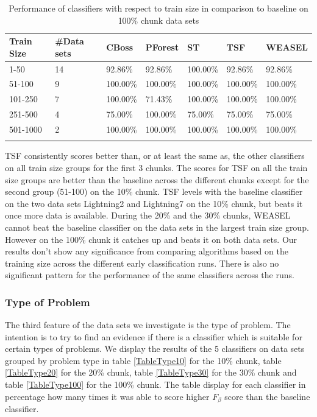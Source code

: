 \begin{table}[hp!]
	\setlength\extrarowheight{2pt} %
	\begin{tabularx}{\textwidth}{|X|X|X|X|X|X|X|}
	\hline
	\textbf{Train Size} & \textbf{\#Data sets} & \textbf{CBoss} & \textbf{PForest} & \textbf{ST} & \textbf{TSF} & \textbf{WEASEL} \\ \hline
		1-50 & 14 & 92.86\% & 92.86\% & 100.00\% & 92.86\% & 92.86\% \\ \hline
		51-100 & 9 & 100.00\% & 100.00\% & 100.00\% & 100.00\% & 100.00\% \\ \hline
		101-250 & 7 & 100.00\% & 71.43\% & 100.00\% & 100.00\% & 100.00\% \\ \hline
		251-500 & 4 & 75.00\% & 100.00\% & 75.00\% & 75.00\% & 75.00\% \\ \hline
		501-1000 & 2 &100.00\% & 100.00\% & 100.00\% & 100.00\% & 100.00\% \\ \hline
  \caption{Performance of classifiers with respect to train size in comparison to baseline on 100\% chunk data sets}
  \label{TableSize100}
  \end{tabularx}
\end{table}

TSF consistently scores better than, or at least the same as, the other classifiers on all train size groups for the first 3 chunks.
The scores for TSF on all the train size groups are better than the baseline across the different chunks except for the second group (51-100) on the 10\% chunk.
TSF levels with the baseline classifier on the two data sets Lightning2 and Lightning7 on the 10\% chunk, but beats it once more data is available.
During the 20\% and the 30\% chunks, WEASEL cannot beat the baseline classifier on the data sets in the largest train size group.
However on the 100\% chunk it catches up and beats it on both data sets.
Our results don't show any significance from comparing algorithms based on the training size across the different early classification runs.
There is also no significant pattern for the performance of the same classifiers across the runs.


\subsubsection{Type of Problem}
The third feature of the data sets we investigate is the type of problem.
The intention is to try to find an evidence if there is a classifier which is suitable for certain types of problems.
We display the results of the 5 classifiers on data sets grouped by problem type in table \ref{TableType10} for the 10\% chunk, table \ref{TableType20} for the 20\% chunk, table \ref{TableType30} for the 30\% chunk and table \ref{TableType100} for the 100\% chunk.
The table display for each classifier in percentage how many times it was able to score higher $F_{\beta}$ score than the baseline classifier.

